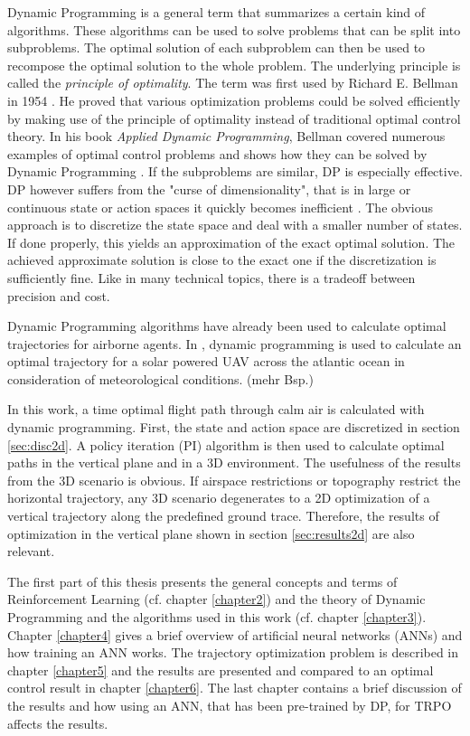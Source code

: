 Dynamic Programming is a general term that summarizes a certain kind of algorithms. These algorithms can be used to solve problems that can be split into subproblems. The optimal solution of each subproblem can then be used to recompose the optimal solution to the whole problem. The underlying principle is called the \textit{principle of optimality}. The term was first used by Richard E. Bellman in 1954 \cite{Bellman1954}. He proved that various optimization problems could be solved efficiently by making use of the principle of optimality instead of traditional optimal control theory. In his book \textit{Applied Dynamic Programming}, Bellman covered numerous examples of optimal control problems and shows how they can be solved by Dynamic Programming \cite{Bellman1962}. 
If the subproblems are similar, DP is especially effective. DP however suffers from the "curse of dimensionality", that is in large or continuous state or action spaces it quickly becomes inefficient \cite{Powell2007ADP}. The obvious approach is to discretize the state space and deal with a smaller number of states. If done properly, this yields an approximation of the exact optimal solution. The achieved approximate solution is close to the exact one if the discretization is sufficiently fine. Like in many technical topics, there is a tradeoff between precision and cost.

Dynamic Programming algorithms have already been used to calculate optimal trajectories for airborne agents. In \cite{Wirth2015MeteorologicalPP}, dynamic programming is used to calculate an optimal trajectory for a solar powered UAV across the atlantic ocean in consideration of meteorological conditions. (mehr Bsp.)

In this work, a time optimal flight path through calm air is calculated with dynamic programming. First, the state and action space are discretized in section \ref{sec:disc2d}. A policy iteration (PI) algorithm is then used to calculate optimal paths in the vertical plane and in a 3D environment. The usefulness of the results from the 3D scenario is obvious. If airspace restrictions or topography restrict the horizontal trajectory, any 3D scenario degenerates to a 2D optimization of a vertical trajectory along the predefined ground trace. Therefore, the results of optimization in the vertical plane shown in section \ref{sec:results2d} are also relevant.

The first part of this thesis presents the general concepts and terms of Reinforcement Learning (cf. chapter \ref{chapter2}) and the theory of Dynamic Programming and the algorithms used in this work (cf. chapter \ref{chapter3}). Chapter \ref{chapter4} gives a brief overview of artificial neural networks (ANNs) and how training an ANN works. The trajectory optimization problem is described in chapter \ref{chapter5} and the results are presented and compared to an optimal control result in chapter \ref{chapter6}. The last chapter contains a brief discussion of the results and how using an ANN, that has been pre-trained by DP, for TRPO affects the results.